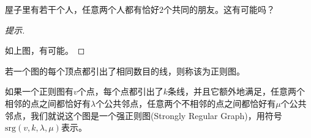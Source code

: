 \begin{example}
  屋子里有若干个人，任意两个人都有恰好$2$个共同的朋友。这有可能吗？
\end{example}
\begin{proof}[提示]\mbox{}\par
  \begin{center}
  \end{center}
  如上图，有可能。  
\end{proof}

\begin{definition}
  若一个图的每个顶点都引出了相同数目的线，则称该为正则图。

  如果一个正则图有$v$个点，每个点都引出了$k$条线，并且它额外地满足，任意两个相邻的点之间都恰好有$\lambda$个公共邻点，任意两个不相邻的点之间都恰好有$\mu$个公共邻点，我们就说这个图是一个强正则图(Strongly Regular Graph)，用符号$\mathrm{srg}(v,k,\lambda,\mu)$表示。
\end{definition}

